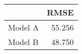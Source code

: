 
\begin{tabular}{l|r}
\hline
  & RMSE\\
\hline
Model A & 55.256\\
\hline
Model B & 48.750\\
\hline
\end{tabular}